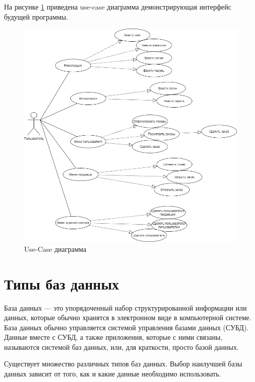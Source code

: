 \newpage

\hspace{0.6cm} На рисунке \ref{fig:image17} приведена use-case диаграмма демонстрирующая интерфейс будущей программы.

\begin{figure}[ht!]
  \centering
  \includegraphics[scale=0.5]{Use-Case диаграмма.drawio.png}
  \caption{Use-Case диаграмма}
  \label{fig:image17}
\end{figure}

\section{Типы баз данных}

\hspace{0.6cm} База данных — это упорядоченный набор структурированной информации или данных, которые обычно хранятся в электронном виде в компьютерной системе. База данных обычно управляется системой управления базами данных (СУБД). Данные вместе с СУБД, а также приложения, которые с ними связаны, называются системой баз данных, или, для краткости, просто базой данных\cite{web:DBTypes}.

\hspace{0.6cm} Существует множество различных типов баз данных. Выбор наилучшей базы данных зависит от того, как и какие данные необходимо использовать.

